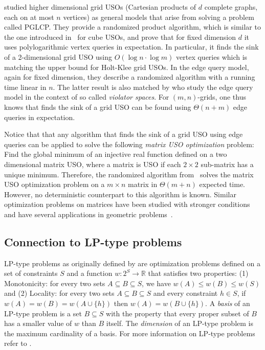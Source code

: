 \documentclass[runningheads,a4paper]{llncs}
\begin{document}

\citet{grid08} studied higher dimensional grid USOs (Cartesian products of $d$ complete graphs, each on at most $n$ vertices) as general models that arise from solving a problem called PGLCP. 
They provide a randomized product algorithm, which is similar to the one introduced in~\cite{SW} for cube USOs, and prove that for fixed dimension $d$ it uses polylogarithmic vertex queries in expectation. In particular, it finds the sink of a 2-dimensional grid USO using $O(\log n \cdot \log m)$ vertex queries which is matching the upper bound for Holt-Klee grid USOs.
In the edge query model, again for fixed dimension, they describe a randomized algorithm with a running time linear in $n$. The latter result is also matched by \citet{DBLP:journals/dam/GartnerMRS08} who study the edge query model in the context of so called \emph{violator spaces}.
For $(m,n)$-grids, one thus knows that finds the sink of a grid USO can be found using $\Theta(n + m)$ edge queries in expectation.

Notice that that any algorithm that finds the sink of a grid USO using edge queries can be applied to solve the following \emph{matrix USO optimization} problem: Find the global minimum of an injective real function defined on a two dimensional matrix USO, where a matrix is USO if each $2\times 2$ sub-matrix has a unique minimum. 
Therefore, the randomized algorithm from~\citet{grid08} solves the matrix USO optimization problem on a $m\times n$ matrix in $\Theta(m+n)$ expected time. However, no deterministic counterpart to this algorithm is known. 
Similar optimization problems on matrices have been studied with stronger conditions and have several applications in geometric problems~\cite{aggarwal1987geometric,demaine2005optimizing,galil1992dynamic,mityagin2003complexity}.

\subsection{Connection to LP-type problems}
LP-type problems as originally defined by \citet{SharirW92} are optimization problems defined on a set of constraints $S$ and a function 
$w:2^S \rightarrow \mathbb{R}$
that satisfies two properties: (1) Monotonicity: for every two sets $A \subseteq B \subseteq S$, we have $w(A) \leq w(B) \leq w(S)$ and
(2) Locality: for every two sets $A \subseteq B \subseteq S$ and every constraint $h \in S$, if $w(A) = w(B) = w(A\cup \{h\})$ then 
$w(A) = w(B \cup \{h\})$.
A \emph{basis} of an LP-type problem is a set $B \subseteq S$ with the property that every proper subset
of $B$ has a smaller value of $w$ than $B$ itself. The \emph{dimension} of an LP-type problem 
is the maximum cardinality of a basis. For more information on LP-type problems refer to \cite{MatousekSW96}.
\end{document}
